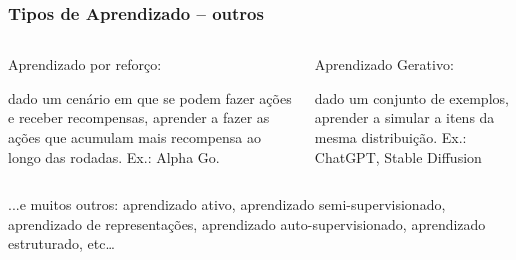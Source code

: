 \begin{frame}
    \frametitle{Tipos de Aprendizado – outros}
    \begin{columns} 
        
        \begin{block}{Aprendizado por reforço:}
            \begin{flushleft}
                dado um cenário em que se podem fazer ações e receber recompensas, aprender a fazer as ações que acumulam mais recompensa ao longo das rodadas. Ex.: Alpha Go.    
            \end{flushleft}                    
        \end{block}
        
        \begin{block}{Aprendizado Gerativo:}
            \begin{flushleft}
                dado um conjunto de exemplos, aprender a simular a itens da mesma distribuição. Ex.: ChatGPT, Stable Diffusion
            \end{flushleft}
        \end{block}
    \end{columns}
    \vspace{2mm}
    \begin{flushleft}
        \begin{block}{...e muitos outros:}
            aprendizado ativo, aprendizado semi-supervisionado, aprendizado de representações, aprendizado auto-supervisionado, aprendizado estruturado, etc…    
        \end{block}
    \end{flushleft}

\end{frame}